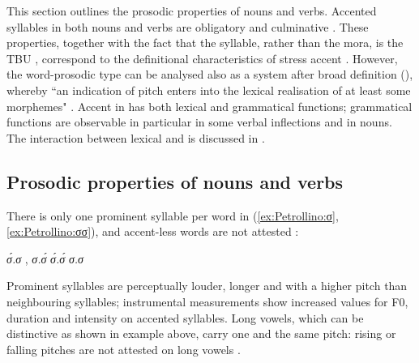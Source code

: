 \documentclass[output=paper,modfonts,nonflat,hidelinks]{langsci/langscibook}
\begin{document}
This section outlines the prosodic properties of  nouns and verbs. Accented syllables in both nouns and verbs are obligatory and culminative . These properties, together with the fact that the syllable, rather than the mora, is the TBU , correspond to the definitional characteristics of stress accent \citep[231]{Hyman2006}. However, the  word-prosodic type can be analysed also as a  system after  broad definition (\citeyear{Hyman2001}), whereby “an indication of pitch enters into the lexical realisation of at least some morphemes" \citep[1367]{Hyman2001}. Accent in  has both lexical and grammatical functions; grammatical functions are observable in particular in some verbal inflections and in  nouns. The interaction between lexical and  is discussed in . 

\subsection{Prosodic properties of nouns and verbs} \label{sec:Petrollino:stress}   

There is only one prominent syllable per word in  (\ref{ex:Petrollino:σ}, \ref{ex:Petrollino:σσ}), and accent-less words are not attested :

\begin{exe}
\ex  \begin{xlist} \label{ex:Petrollino:obligatorinessculminativity}
\ex  \textit{σ́.σ}  ,  \textit{σ.σ́} \label{ex:Petrollino:σ}
\ex *\textit{σ́.σ́}  \label{ex:Petrollino:σσ}
\ex *\textit{σ.σ} \label{ex:Petrollino:σσσ}
\end{xlist}
\end{exe}

Prominent syllables are perceptually louder, longer and with a higher pitch than neighbouring syllables; instrumental measurements show increased values for F0, duration and intensity on accented syllables. Long vowels, which can be distinctive as shown in example  above, carry one and the same pitch: rising or falling pitches are not attested on long vowels .
\end{document}
